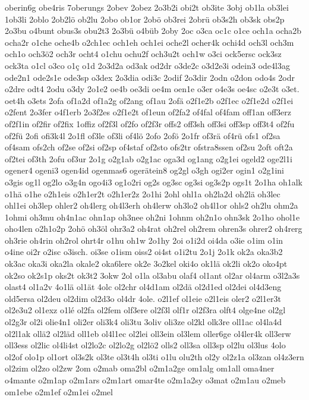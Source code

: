 {oberin6g
obe4ris
7oberungs
2obev
2obez
2o3b2i
obi2t
ob3ite
3obj
ob1la
ob3lei
1ob3li
2oblo
2ob2lö
ob2lu
2obo
ob1or
2obö
ob3rei
2obrü
ob3s2h
ob3sk
obs2p
2o3bu
o4bunt
obus3s
obu2t3
2o3bü
o4büb
2oby
2oc
o3ca
oc1c
o1ce
och1a
ocha2b
ocha2r
o1che
oche4b
o2ch1ec
och1eh
och1ei
oche2l
ocher4k
ochi4d
och3l
och3m
och1o
och3ö2
och3r
ocht4
o1chu
ochu2f
och3u2t
och1w
o3ci
ock5ersc
ock3sz
ock3ta
o1cl
o3co
o1ç
o1d
2o3d2a
od3ak
od2dr
o3de2c
o3d2e3i
odein3
ode4l3ag
ode2n1
ode2s1e
ode3sp
o3dex
2o3dia
odi3c
2odif
2o3dir
2odn
o2don
odo4s
2odr
o2dre
odt4
2odu
o3dy
2o1e2
oe4b
oe3di
oe4m
oen1e
o3er
o4e3s
oe4sc
o2e3t
o3et.
oet4h
o3ets
2ofa
of1a2d
of1a2g
of2ang
of1au
2ofä
o2f1e2b
o2f1ec
o2f1e2d
o2f1ei
o2fent
2o3fer
o4f1erb
2o3f2es
o2f1e2t
of1eun
of2fa2
of4fal
of4fam
off1an
off3erz
of2f1in
of2fir
of2fix
1offiz
of2f3l
of2fo
of2f3r
offs2
off3sh
off3si
off3sp
off3t4
of2fu
of2fü
2ofi
ofi3k4l
2o1fl
of3le
of3li
of4lö
2ofo
2ofö
2o1fr
of3rä
of4rü
ofs1
of2sa
of4sam
ofs2ch
of2se
of2si
of2sp
of4staf
of2sto
ofs2tr
ofstra8ssen
of2su
2oft
oft2a
of2tei
of3th
2ofu
of3ur
2o1g
o2g1ab
o2g1ac
oga3d
og1ang
o2g1ei
ogeld2
oge2l1i
ogener4
ogeni3
ogen4id
ogenmas6
ogerätein8
og2gl
o3gh
ogi2er
ogin1
o2g1ini
o3gis
og1l
og2lo
o3g4n
ogo4i3
og1o2ri
og2s
og3sc
og3si
og3s2p
ogs1t
2o1ha
oh1alk
o1hä
o1he
o2h1eis
o2h1er2t
o2h1er2z
2o1hi
2ohl
ohl1a
oh2la2d
oh2lä
oh3lec
ohl1ei
oh3lep
ohler2
oh4lerg
oh4l3erh
oh4lerw
oh3lo2
oh4l1or
ohls2
oh2lu
ohm2a
1ohmi
oh3mu
oh4n1ac
ohn1ap
oh3nee
oh2ni
1ohnm
oh2n1o
ohn3sk
2o1ho
ohol1e
oho4len
o2h1o2p
2ohö
oh3öl
ohr3a2
oh4rat
oh2rel
oh2rem
ohren3s
ohrer2
oh4rerg
oh3rie
oh4rin
oh2rol
ohrt4r
o1hu
oh1w
2o1hy
2oi
o1i2d
oi4da
o3ie
o1im
o1in
o4ine
oi2r
o2isc
o3isch.
oi3se
o1ism
oiss2
oi4st
o1i2tu
2o1j
2o1k
ok2a
oka3b2
ok3ac
oka3i
oka2la
okale2
oka6lere
ok2e
3o2kel
oki4o
ok1lä
ok2li
ok2o
oko4pt
ok2so
ok2s1p
oks2t
ok3t2
3okw
2ol
o1la
ol3abu
olaf4
ol1ant
ol2ar
ol4arm
o3l2a3s
olast4
ol1a2v
4o1lä
ol1ät
4olc
ol2chr
ol4d1am
ol2dä
ol2d1ed
ol2dei
ol4d3eng
old5ersa
ol2deu
ol2dim
ol2d3o
ol4dr
4ole.
o2l1ef
ol1eie
o2l1eis
oler2
o2l1er3t
ol2e3u2
ol1exz
o1lé
ol2fa
ol2fem
olf3ere
ol2f3l
olf1r
ol2f3ra
olft4
olge4ne
ol2gl
ol2g3r
ol2i
olie4n1
oli2er
oli3k4
oli3tu
3oliv
oli3ze
ol2kl
olk3re
oll1ac
ol4la4d
ol2l1ak
ollä2
ol2läd
oll1eb
ol4l1ec
ol2lei
oll3ein
ol3lem
oller6ge
ol4ler4k
oll3erw
oll3ess
ol2lic
ol4li4st
ol2lo2c
ol2lo2g
ol2lö2
olls2
oll3sa
oll3sp
ol2lu
ol3lus
4olo
ol2of
olo1p
ol1ort
ol3s2k
ol3te
ol3t4h
ol3ti
o1lu
olu2th
ol2y
ol2z1a
ol3zan
ol4z3ern
ol2zim
ol2zo
ol2zw
2om
o2mab
oma2bl
o2m1a2ge
om1alg
om1all
oma4ner
o4mante
o2m1ap
o2m1ars
o2m1art
omar4te
o2m1a2sy
o3mat
o2m1au
o2meb
om1ebe
o2m1ef
o2m1ei
o2mel
}

